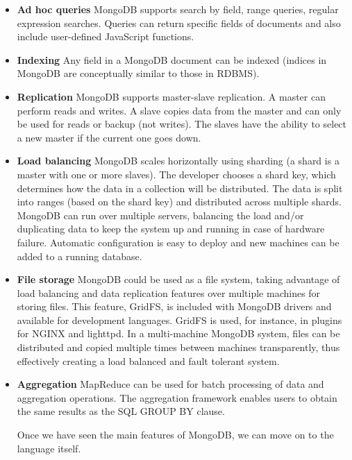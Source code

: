 \begin{itemize}

\item \textbf{Ad hoc queries} 
MongoDB supports search by field, range queries, regular expression searches. Queries can return specific fields of documents and also include user-defined JavaScript functions.

\item \textbf{Indexing} 
Any field in a MongoDB document can be indexed (indices in MongoDB are conceptually similar to those in RDBMS).

\item \textbf{Replication} 
MongoDB supports master-slave replication. A master can perform reads and writes. A slave copies data from the master and can only be used for reads or backup (not writes). The slaves have the ability to select a new master if the current one goes down.

\item \textbf{Load balancing} 
MongoDB scales horizontally using sharding (a shard is a master with one or more slaves). The developer chooses a shard key, which determines how the data in a collection will be distributed. The data is split into ranges (based on the shard key) and distributed across multiple shards. MongoDB can run over multiple servers, balancing the load and/or duplicating data to keep the system up and running in case of hardware failure. Automatic configuration is easy to deploy and new machines can be added to a running database.

\item \textbf{File storage} 
MongoDB could be used as a file system, taking advantage of load balancing and data replication features over multiple machines for storing files. This feature, GridFS, is included with MongoDB drivers and available for development languages. GridFS is used, for instance, in plugins for NGINX and lighttpd. In a multi-machine MongoDB system, files can be distributed and copied multiple times between machines transparently, thus effectively creating a load balanced and fault tolerant system.

\item \textbf{Aggregation} 
MapReduce can be used for batch processing of data and aggregation operations. The aggregation framework enables users to obtain the same results as the SQL GROUP BY clause.

Once we have seen the main features of MongoDB, we can move on to the language itself.
\end{itemize}


